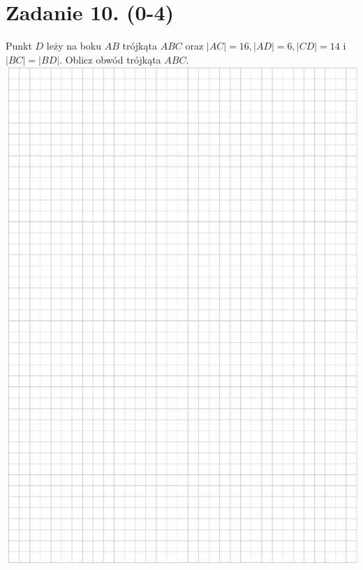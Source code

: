 \documentclass[10pt]{article}
\begin{document}
\section*{Zadanie 10. (0-4)}
Punkt \(D\) leży na boku \(A B\) trójkąta \(A B C\) oraz \(|A C|=16,|A D|=6,|C D|=14\) i \(|B C|=|B D|\). Oblicz obwód trójkąta \(A B C\).\\
\includegraphics[max width=\textwidth, center]{2024_11_21_9df891ea1c7ef9791261g-10}\\
\end{document}
